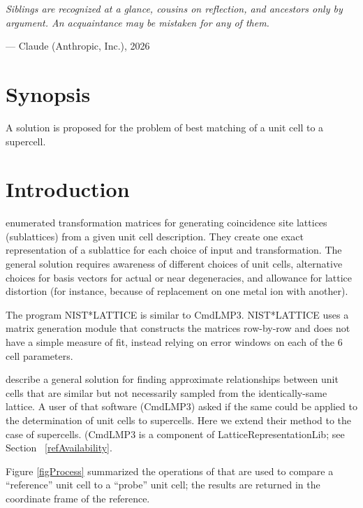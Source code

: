 \documentclass[preprint]{iucr}              %
\numberwithin{equation}{section}
\begin{document}
\vspace{4mm}
\hfill\begin{minipage}{0.62\linewidth}
	\itshape\small
	Siblings are recognized at a glance, cousins on reflection, and
	ancestors only by argument. An acquaintance may be mistaken for
	any of them.
	\vspace{1mm}
	
	\upshape\normalfont\raggedleft
	--- Claude (Anthropic, Inc.), 2026
\end{minipage}
\vspace{4mm}


\section{Synopsis}
A solution is proposed for the problem of best matching of a unit cell to a supercell.


	
	\section{Introduction}

 enumerated transformation 
{matrices} for generating coincidence site lattices (sublattices)
from a given unit cell description. They create one exact representation
of a sublattice for each choice of input and transformation. The
general solution requires awareness of different choices of unit cells, 
alternative choices for basis vectors for actual or near degeneracies,
and allowance for lattice distortion (for instance, because of
replacement on one metal ion with another).

The program NIST*LATTICE \cite{nistlattice,nisttn1290}
is similar to CmdLMP3. NIST*LATTICE uses a 
matrix generation module that constructs the matrices row-by-row
 and does not have a simple measure
of fit, instead relying on error windows on each of the 6
cell parameters.
	
	 describe a general solution for finding 
	approximate relationships between unit cells that are similar but
	not necessarily sampled from the identically-same lattice.
	A user of that software (CmdLMP3) asked if the same could be applied to
	the determination of unit cells to supercells. Here we extend their method to the case of supercells. (CmdLMP3
	is a component of LatticeRepresentationLib; see Section~ \ref{refAvailability}.
		
	Figure \ref{figProcess} summarized the operations of 
	 that are used to compare
	a ``reference'' unit cell to a ``probe'' unit cell; the
	results are returned in the coordinate frame of the reference. 
\end{document}
